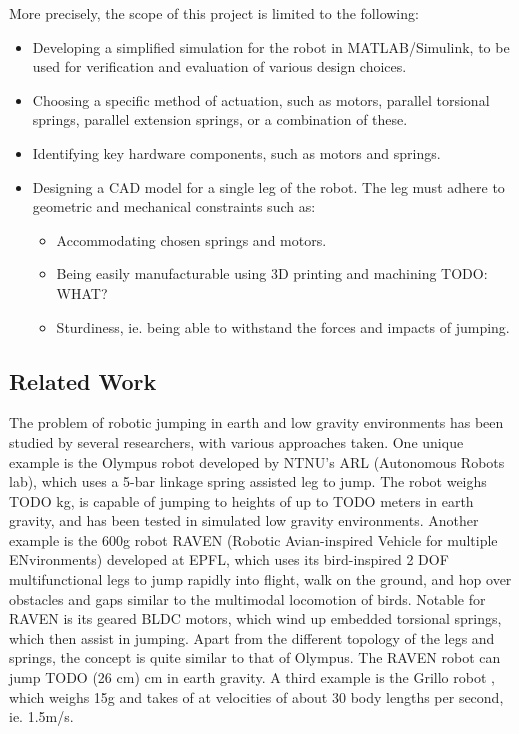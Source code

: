 More precisely, the scope of this project is limited to the following:
\begin{itemize}
    \item Developing a simplified simulation for the robot in MATLAB/Simulink, to be used for verification and evaluation of various design choices. 
    \item Choosing a specific method of actuation, such as motors, parallel torsional springs, parallel extension springs, or a combination of these.
    \item Identifying key hardware components, such as motors and springs. 
    \item Designing a CAD model for a single leg of the robot. The leg must adhere to geometric and mechanical constraints such as:
    \begin{itemize}
    \item Accommodating chosen springs and motors. 
    \item Being easily manufacturable using 3D printing and machining TODO: WHAT?
    \item Sturdiness, ie. being able to withstand the forces and impacts of jumping.
    \end{itemize}
\end{itemize}

\subsection{Related Work}

The problem of robotic jumping in earth and low gravity environments has been studied by several researchers, with various approaches taken. One unique example is the Olympus robot \cite{OLYMPUS1} \cite{OLYMPUS2} developed by NTNU's ARL (Autonomous Robots lab), which uses a 5-bar linkage spring assisted leg to jump. The robot weighs TODO kg, is capable of jumping to heights of up to TODO meters in earth gravity, and has been tested in simulated low gravity environments. Another example is the 600g robot RAVEN (Robotic Avian-inspired Vehicle for multiple ENvironments) \cite{RAVEN} developed at EPFL, which uses its bird-inspired 2 DOF multifunctional legs to jump rapidly into flight, walk on the ground, and hop over obstacles and gaps similar to the multimodal locomotion of birds. Notable for RAVEN is its geared BLDC motors, which wind up embedded torsional springs, which then assist in jumping. Apart from the different topology of the legs and springs, the concept is quite similar to that of Olympus. The RAVEN robot can jump TODO (26 cm) cm in earth gravity. A third example is the Grillo robot \cite{GRILLO}, which weighs 15g and takes of at velocities of about 30 body lengths per second, ie. 1.5m/s. 

